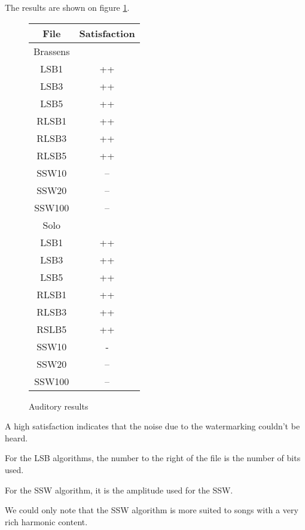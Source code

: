 The results are shown on figure \ref{fig:auditory}.
\begin{figure}[h!]
\centering
\begin{tabular}{|c|c|}
\hline
File & Satisfaction \\
\hline
Brassens & \\
\hline
LSB1 & ++ \\
LSB3 & ++ \\
LSB5 & ++ \\
RLSB1 & ++ \\
RLSB3 & ++ \\
RLSB5 & ++ \\
SSW10 & -- \\
SSW20 & -- \\
SSW100 & -- \\
\hline
Solo  & \\
\hline
LSB1 & ++ \\
LSB3 & ++ \\
LSB5 & ++\\
RLSB1 & ++\\
RLSB3 & ++\\
RSLB5 & ++\\
SSW10 & -\\
SSW20 & --\\
SSW100 & --\\
\hline
\end{tabular}
\caption{Auditory results}
\label{fig:auditory}
\end{figure}

A high satisfaction indicates that the noise due to the watermarking couldn't be heard.

For the \ac{LSB} algorithms, the number to the right of the file is the number of bits used.

For the \ac{SSW} algorithm, it is the amplitude used for the SSW.

We could only note that the \ac{SSW} algorithm is more suited to songs with a very rich harmonic content.